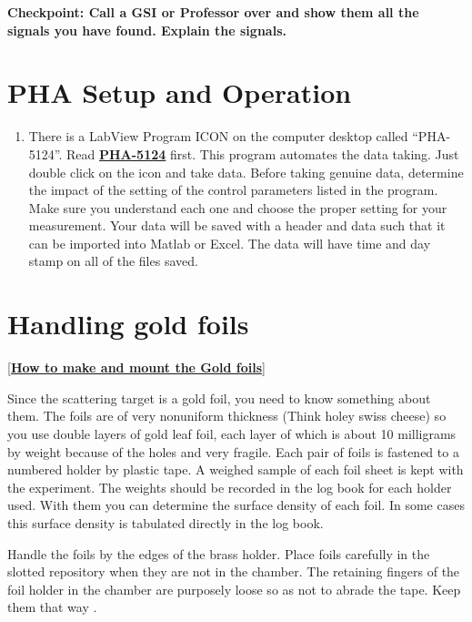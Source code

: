 \documentclass{../lab}
\begin{document}
\textbf{Checkpoint: Call a GSI or Professor over and show them all the signals you have found. Explain the signals.}

\section{PHA Setup and Operation}

\begin{enumerate}
    \item There is a LabView Program ICON on the computer desktop called ``PHA-5124''. Read \href{http://experimentationlab.berkeley.edu/PHA-5124Program}{\textbf{PHA-5124}} first. This program automates the data taking. Just double click on the icon and take data. Before taking genuine data, determine the impact of the setting of the control parameters listed in the program. Make sure you understand each one and choose the proper setting for your measurement. Your data will be saved with a header and data such that it can be imported into Matlab or Excel. The data will have time and day stamp on all of the files saved.

\end{enumerate}

\section{Handling gold foils}

[\href{http://physics111.lib.berkeley.edu/Physics111/Reprints/RUT/Procedure\%20for\%20Making\%20Foils.pdf}{\textbf{How to make and mount the Gold foils}}]

Since the scattering target is a gold foil, you need to know something about them. The foils are of very nonuniform thickness (Think holey swiss cheese) so you use double layers of gold leaf foil, each layer of which is about 10 milligrams by weight because of the holes and very fragile. Each pair of foils is fastened to a numbered holder by plastic tape. A weighed sample of each foil sheet is kept with the experiment. The weights should be recorded in the log book for each holder used. With them you can determine the surface density of each foil. In some cases this surface density is tabulated directly in the log book.

Handle the foils by the edges of the brass holder. Place foils carefully in the slotted repository when they are not in the chamber. The retaining fingers of the foil holder in the chamber are purposely loose so as not to abrade the tape. Keep them that way .
\end{document}
